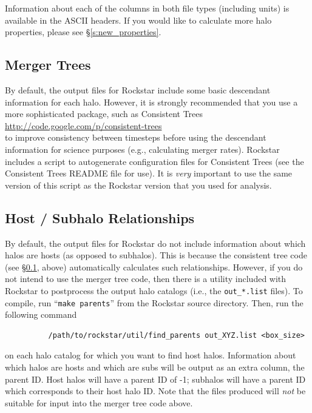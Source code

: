\documentclass[12pt]{article}
\begin{document}
Information about each of the columns in both file types (including units) is available in the ASCII headers.  If you would like to calculate more halo properties, please see \S \ref{s:new_properties}.  



\subsection{Merger Trees}
	\label{s:merger_trees}
      By default, the output files for Rockstar include some basic descendant
      information for each halo.  However, it is strongly recommended that
      you use a more sophisticated package, such as Consistent Trees\\[1ex]
      \url{http://code.google.com/p/consistent-trees}\\[1ex] 
      to improve consistency
      between timesteps before using the descendant information for science
      purposes (e.g., calculating merger rates).  Rockstar includes a script
      to autogenerate configuration files for Consistent Trees (see the
      Consistent Trees README file for use).  It is \textit{very} important to use the
      same version of this script as the Rockstar version that you used for analysis.

\subsection{Host / Subhalo Relationships}
      By default, the output files for Rockstar do not include information
      about which halos are hosts (as opposed to subhalos).  This is because
      the consistent tree code (see \S \ref{s:merger_trees}, above) automatically
      calculates such relationships.  However, if you do not intend to use the
      merger tree code, then there is a utility included with Rockstar to
      postprocess the output halo catalogs (i.e., the \texttt{out\_*.list} files).  To
      compile, run ``\texttt{make parents}'' from the Rockstar source directory.  Then,
      run the following command
\begin{verbatim}
      	  /path/to/rockstar/util/find_parents out_XYZ.list <box_size>
\end{verbatim}
      on each halo catalog for which you want to find host halos.  Information
      about which halos are hosts and which are subs will be output as an
      extra column, the parent ID.  Host halos will have a parent ID of -1;
      subhalos will have a parent ID which corresponds to their host halo ID.
      Note that the files produced will \textit{not} be suitable for input into the
      merger tree code above.
\end{document}
